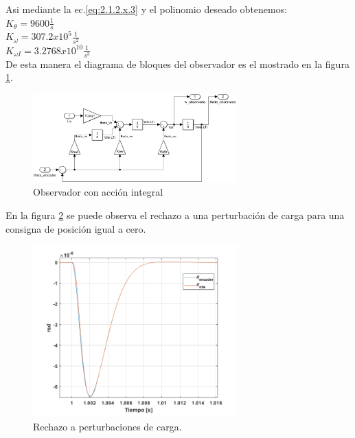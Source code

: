 \documentclass[10pt]{article}
\begin{document}
\begin{itemize}
	Asi mediante la ec.\ref{eq:2.1.2.x.3} y el polinomio deseado obtenemos:\\
	$K_{\theta}=9600 \frac{1}{s}$\\
	$K_{\omega}=307.2x10^{5} \frac{1}{s^{2}}$\\
	$K_{\omega I}=3.2768 x 10^{10} \frac{1}{s^{3}}$\\

	De esta manera el diagrama de bloques del observador es el mostrado en la figura \ref{fig:observadornuevo}.
	\begin{figure}[h!]
		\centering
		\includegraphics[width=0.7\textwidth]{observadornuevo.png}
		\caption{\label{fig:observadornuevo}Observador con acción integral}
		\end{figure}
	En la figura \ref{fig:obs} se puede observa el rechazo a una perturbación de carga para una consigna de posición igual a cero.
	\begin{figure}[h!]
		\centering
		\includegraphics[width=0.7\textwidth]{obs.png}
		\caption{\label{fig:obs}Rechazo a perturbaciones de carga.}
		\end{figure}


\end{itemize}
\end{document}
